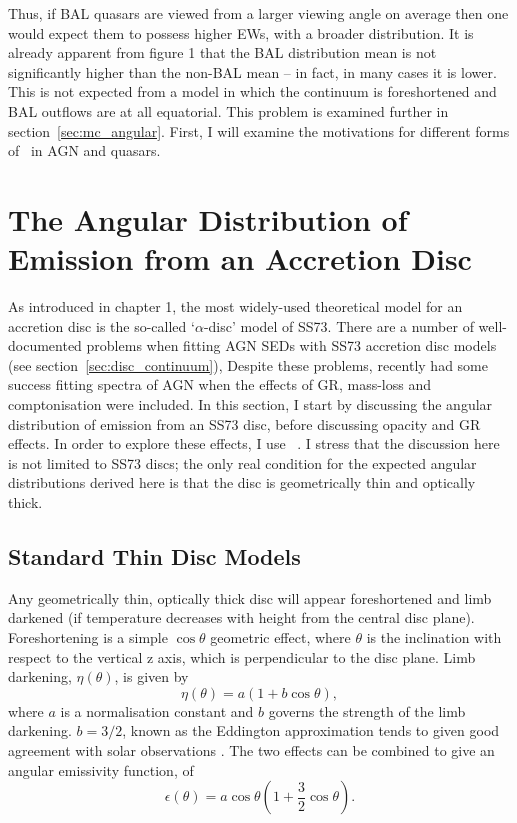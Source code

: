 Thus, if BAL quasars are viewed from a larger viewing angle on average then one
would expect them to possess higher EWs, with a broader distribution.
It is already apparent from figure 1 that the BAL distribution mean 
is not significantly higher than the non-BAL
mean -- in fact, in many cases it is lower. This is not expected from a model
in which the continuum is foreshortened and BAL outflows are at all equatorial.
This problem is examined further in section~\ref{sec:mc_angular}. 
First, I will examine the motivations for different forms of \ept\ 
in AGN and quasars.

\section{The Angular Distribution of Emission from an Accretion Disc}
\label{sec:disc_agn}

\noindent 
As introduced in chapter 1, the most widely-used theoretical model for an accretion disc
is the so-called `$\alpha$-disc' model of SS73. 
There are a number of well-documented problems when fitting 
AGN SEDs with SS73 accretion disc models (see section~\ref{sec:disc_continuum}), 
Despite these problems, \cite{capellupo2015} recently had 
some success fitting spectra of AGN when the effects of
GR, mass-loss and comptonisation were included.
In this section, I start by discussing the angular distribution of
emission from an SS73 disc, before discussing opacity and GR 
effects. In order to explore these effects, I use \agn\
\citep{hubeny2000,davishubeny2006,davis2007}. I stress that the 
discussion here is not limited to SS73 discs; the only real condition
for the expected angular distributions derived here is that the 
disc is geometrically thin and optically thick.

\subsection{Standard Thin Disc Models}

\noindent
Any geometrically thin, optically thick disc will appear
foreshortened and limb darkened (if temperature decreases
with height from the central disc plane). 
Foreshortening is a simple $\cos \theta$ geometric effect, 
where $\theta$ is the inclination with respect to the vertical z axis, which
is perpendicular to the disc plane.
Limb darkening, $\eta(\theta)$, is given by
\begin{equation}
\eta(\theta) = a \left( 1 + b \cos \theta \right),
\end{equation}
where $a$ is a normalisation constant and $b$ governs the strength
of the limb darkening. $b=3/2$, known as the Eddington approximation
tends to given good agreement with solar observations 
\citep[e.g.][]{mihalas}. The two effects can be 
combined to give an angular emissivity function, of
\begin{equation}
\epsilon(\theta) = a \cos \theta \left( 1 + \frac{3}{2} \cos \theta \right).
\end{equation}

